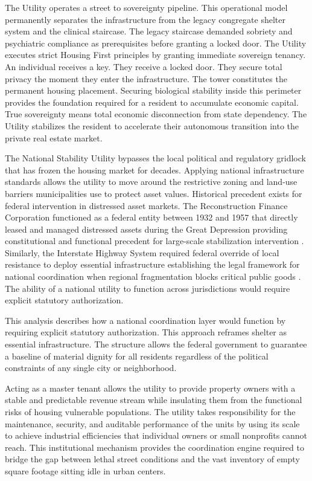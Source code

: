 \documentclass[12pt, letterpaper]{article}
\begin{document}
The Utility operates a street to sovereignty pipeline. This operational model permanently separates the infrastructure from the legacy congregate shelter system and the clinical staircase. The legacy staircase demanded sobriety and psychiatric compliance as prerequisites before granting a locked door. The Utility executes strict Housing First principles by granting immediate sovereign tenancy. An individual receives a key. They receive a locked door. They secure total privacy the moment they enter the infrastructure. The tower constitutes the permanent housing placement. Securing biological stability inside this perimeter provides the foundation required for a resident to accumulate economic capital. True sovereignty means total economic disconnection from state dependency. The Utility stabilizes the resident to accelerate their autonomous transition into the private real estate market.

The National Stability Utility bypasses the local political and regulatory gridlock that has frozen the housing market for decades. Applying national infrastructure standards allows the utility to move around the restrictive zoning and land-use barriers municipalities use to protect asset values. Historical precedent exists for federal intervention in distressed asset markets. The Reconstruction Finance Corporation functioned as a federal entity between 1932 and 1957 that directly leased and managed distressed assets during the Great Depression providing constitutional and functional precedent for large-scale stabilization intervention \citep{jones_1951}. Similarly, the Interstate Highway System required federal override of local resistance to deploy essential infrastructure establishing the legal framework for national coordination when regional fragmentation blocks critical public goods \citep{rose_1990}. The ability of a national utility to function across jurisdictions would require explicit statutory authorization.

This analysis describes how a national coordination layer would function by requiring explicit statutory authorization. This approach reframes shelter as essential infrastructure. The structure allows the federal government to guarantee a baseline of material dignity for all residents regardless of the political constraints of any single city or neighborhood.

Acting as a master tenant allows the utility to provide property owners with a stable and predictable revenue stream while insulating them from the functional risks of housing vulnerable populations. The utility takes responsibility for the maintenance, security, and auditable performance of the units by using its scale to achieve industrial efficiencies that individual owners or small nonprofits cannot reach. This institutional mechanism provides the coordination engine required to bridge the gap between lethal street conditions and the vast inventory of empty square footage sitting idle in urban centers.
\end{document}
